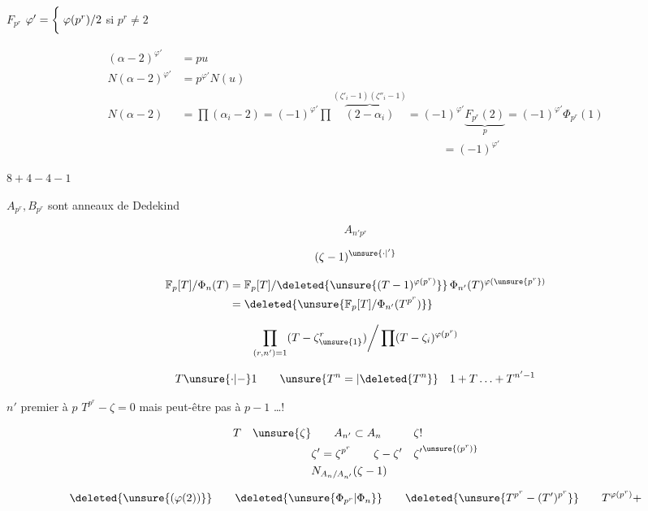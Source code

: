 
$F_{p^r}$ \qquad $\varphi'=\left\{\vphantom{\dfrac12}\right.\varphi(p^r)/2$ si $p^r\ne2$

\[
\begin{aligned}
(\alpha-2)^{\varphi'}&=pu\\
N(\alpha-2)^{\varphi'}&=p^{\varphi'}N(u)\\
N(\alpha-2)&=\prod(\alpha_i-2)=(-1)^{\varphi'}\prod\overbrace{(2-\alpha_i)}^{(\zeta'_i-1)(\zeta''_i-1)}
=(-1)^{\varphi'}\underbrace{F_{p^r}(2)}_{p}=(-1)^{\varphi'}\Phi_{p^r}(1)\\
&\hspace{23em}=(-1)^{\varphi'}
\end{aligned}
\]

$8+4-4-1$

 $A_{p^r},B_{p^r}$ sont anneaux de Dedekind

\[
A_{n'p^r}
\]

\[
(\zeta-1)^{\unsure{\cdot|'}}
\]

\[
\begin{aligned}
\mathbb F_p[T]/\Phi_n(T)&=\mathbb F_p[T]/\deleted{\unsure{(T-1)^{\varphi(p^r)}}}\,\Phi_{n'}(T)^{\varphi(\unsure{p^r})}\\
&=\deleted{\unsure{\mathbb F_p[T]/\Phi_{n'}(T^{p^r})}}
\end{aligned}
\]

\[
\prod_{(r,n')=1}(T-\zeta^{r}_{\unsure{1}})\bigg/\prod(T-\zeta_i)^{\varphi(p^r)}
\]

\[
T\unsure{\cdot|-}1\qquad \unsure{T^n=|\deleted{T^n}}\quad1+T\ldots+T^{n'-1}
\]

$n'$ premier à $p$ \hfill $T^{p^r}-\zeta=0$ mais peut-être pas à $p-1$ \ldots !

\[
\begin{aligned}
T\quad\unsure{\zeta}&\qquad A_{n'}\subset A_n&&\zeta!\\
&\zeta'=\zeta^{p^r}\qquad\zeta-\zeta'&&{\zeta'}^{\unsure{(p^r)}}\\
&N_{A_n/A_{n'}}(\zeta-1)
\end{aligned}
\]


\[
\deleted{\unsure{(\varphi(2))}}\qquad\deleted{\unsure{\Phi_{p^r}|\Phi_n}}\qquad\deleted{\unsure{T^{p^r}-(T')^{p^r}}}\qquad T^{\varphi(p^r)}+
\]

